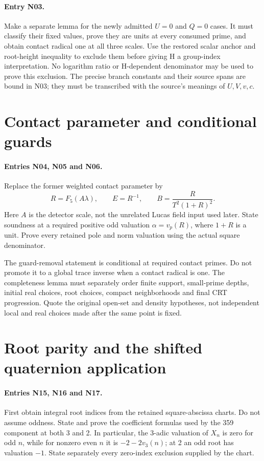 \documentclass{article}
\begin{document}
\paragraph{Entry N03.}
Make a separate lemma for the newly admitted $U=0$ and $Q=0$ cases.
It must classify their fixed values, prove they are units at every
consumed prime, and obtain contact radical one at all three scales.
Use the restored scalar anchor and root-height inequality to exclude
them before giving H a group-index interpretation. No logarithm ratio
or H-dependent denominator may be used to prove this exclusion.
The precise branch constants and their source spans are bound in N03;
they must be transcribed with the source's meanings of $U,V,v,c$.

\section{Contact parameter and conditional guards}
\label{outline:contact}
\paragraph{Entries N04, N05 and N06.}
Replace the former weighted contact parameter by
\[
 R=F_5(A\lambda),\qquad E=R^{-1},\qquad
 B=\frac{R}{T^2(1+R)^2}.
\]
Here $A$ is the detector scale, not the unrelated Lucas field input
used later. State soundness at a required positive odd valuation
$\alpha=v_p(R)$, where $1+R$ is a unit. Prove every retained pole and
norm valuation using the actual square denominator.

The guard-removal statement is conditional at required contact primes.
Do not promote it to a global trace inverse when a contact radical is one.
The completeness lemma must separately order finite support, small-prime
depths, initial real choices, root choices, compact neighborhoods and final
CRT progression. Quote the original open-set and density hypotheses,
not independent local and real choices made after the same point is fixed.

\section{Root parity and the shifted quaternion application}
\label{outline:anchor}
\paragraph{Entries N15, N16 and N17.}
First obtain integral root indices from the retained square-abscissa charts.
Do not assume oddness. State and prove the coefficient formulas used by
the 359 component at both 3 and 2. In particular, the 3-adic valuation
of $X_n$ is zero for odd $n$, while for nonzero even $n$ it is
$-2-2v_3(n)$; at 2 an odd root has valuation $-1$.
State separately every zero-index exclusion supplied by the chart.
\end{document}
